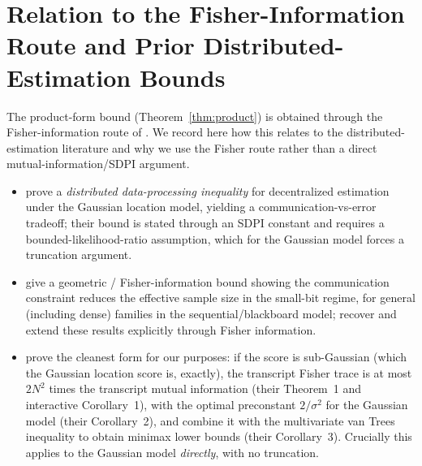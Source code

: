 \documentclass[11pt]{article}
\theoremstyle{definition}
\begin{document}
\FloatBarrier

\section{Relation to the Fisher-Information Route and Prior Distributed-Estimation Bounds}
\label{app:source}

The product-form bound (Theorem~\ref{thm:product}) is obtained through the Fisher-information route of
\citet{barnes2021fisher}. We record here how this relates to the distributed-estimation literature and
why we use the Fisher route rather than a direct mutual-information/SDPI argument.

\begin{itemize}[leftmargin=1.4em,itemsep=2pt]
  \item \citet{braverman2016ddpi} prove a \emph{distributed data-processing inequality} for decentralized
  estimation under the Gaussian location model, yielding a communication-vs-error tradeoff; their bound
  is stated through an SDPI constant and requires a bounded-likelihood-ratio assumption, which for the
  Gaussian model forces a truncation argument.
  \item \citet{han2018geometric} give a geometric / Fisher-information bound showing the communication
  constraint reduces the effective sample size in the small-bit regime, for general (including dense)
  families in the sequential/blackboard model; \citet{barneshanozgur2020} recover and extend these
  results explicitly through Fisher information.
  \item \citet{barnes2021fisher} prove the cleanest form for our purposes: if the score is sub-Gaussian
  (which the Gaussian location score is, exactly), the transcript Fisher trace is at most
  $2N^2$ times the transcript mutual information (their Theorem~1 and interactive Corollary~1), with the
  optimal preconstant $2/\sigma^2$ for the Gaussian model (their Corollary~2), and combine it with the
  multivariate van Trees inequality \citep{gilllevit1995} to obtain minimax lower bounds (their
  Corollary~3). Crucially this applies to the Gaussian model \emph{directly}, with no truncation.
\end{itemize}
\end{document}
